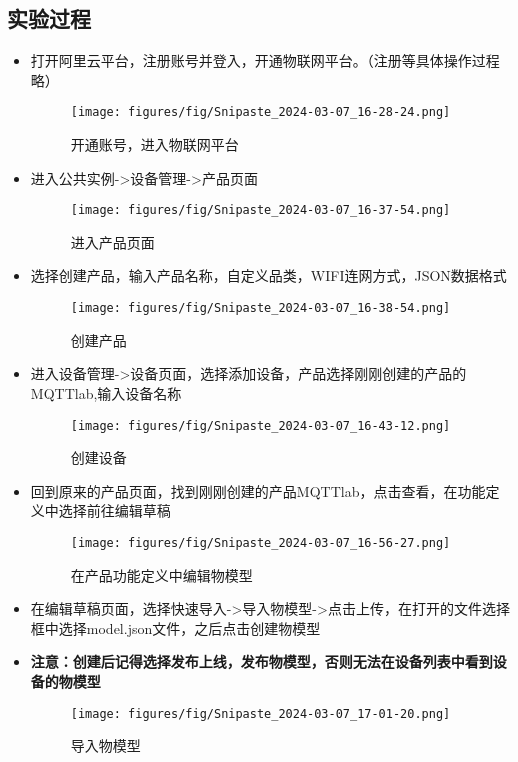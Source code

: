 \documentclass[12pt,hyperref,a4paper,UTF8]{ctexart}
\begin{document}
\subsection{实验过程}

\begin{itemize}[itemsep=-5pt, topsep=0pt, partopsep=0pt]
    \item 打开阿里云平台，注册账号并登入，开通物联网平台。（注册等具体操作过程略）
    \begin{figure}[H]
        \centering
        \texttt{[image: figures/fig/Snipaste\_2024-03-07\_16-28-24.png]}
        \caption{开通账号，进入物联网平台}
        \label{fig:enter-label}
    \end{figure}    
    
    \item 进入公共实例->设备管理->产品页面
    \begin{figure}[H]
        \centering
        \texttt{[image: figures/fig/Snipaste\_2024-03-07\_16-37-54.png]}
        \caption{进入产品页面}
        \label{fig:enter-label}
    \end{figure}  

    \item 选择创建产品，输入产品名称，自定义品类，WIFI连网方式，JSON数据格式
    \begin{figure}[H]
        \centering
        \texttt{[image: figures/fig/Snipaste\_2024-03-07\_16-38-54.png]}
        \caption{创建产品}
        \label{fig:enter-label}
    \end{figure} 

    \item 进入设备管理->设备页面，选择添加设备，产品选择刚刚创建的产品的MQTTlab,输入设备名称
    \begin{figure}[H]
        \centering
        \texttt{[image: figures/fig/Snipaste\_2024-03-07\_16-43-12.png]}
        \caption{创建设备}
        \label{fig:enter-label}
    \end{figure} 

    \item 回到原来的产品页面，找到刚刚创建的产品MQTTlab，点击查看，在功能定义中选择前往编辑草稿
    \begin{figure}[H]
        \centering
        \texttt{[image: figures/fig/Snipaste\_2024-03-07\_16-56-27.png]}
        \caption{在产品功能定义中编辑物模型}
        \label{fig:enter-label}
    \end{figure} 

    \item 在编辑草稿页面，选择快速导入->导入物模型->点击上传，在打开的文件选择框中选择model.json文件，之后点击创建物模型
    \item \bf{注意：创建后记得选择发布上线，发布物模型，否则无法在设备列表中看到设备的物模型}
    \begin{figure}[H]
        \centering
        \texttt{[image: figures/fig/Snipaste\_2024-03-07\_17-01-20.png]}
        \caption{导入物模型}
        \label{fig:enter-label}
    \end{figure} 
\end{itemize}
\end{document}
